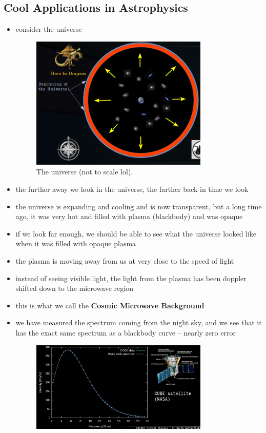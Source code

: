\documentclass[10pt]{article}
\begin{document}
\subsection{Cool Applications in Astrophysics}
\begin{itemize}
    \item consider the universe 
        \begin{figure}[h]
            \centering
            \includegraphics[width=0.8\textwidth]{universe}
            \caption{The universe (not to scale lol).}
            \label{fig:universe}
        \end{figure}
    \item the further away we look in the universe, the farther back in time we look
    \item the universe is expanding and cooling and is now transparent, but a long time ago, it was very hot and filled with plasma (blackbody) and was opaque 
    \item if we look far enough, we should be able to see what the universe looked like when it was filled with opaque plasma 
    \item the plasma is moving away from us at very close to the speed of light
    \item instead of seeing visible light, the light from the plasma has been doppler shifted down to the microwave region
    \item this is what we call the \textbf{Cosmic Microwave Background} 
    \item we have measured the spectrum coming from the night sky, and we see that it has the exact same spectrum as a blackbody curve -- nearly zero error
        \begin{figure}[h]
            \centering
            \includegraphics[width=0.8\textwidth]{cosmicMicroBackground}

\end{figure}
\end{itemize}
\end{document}
